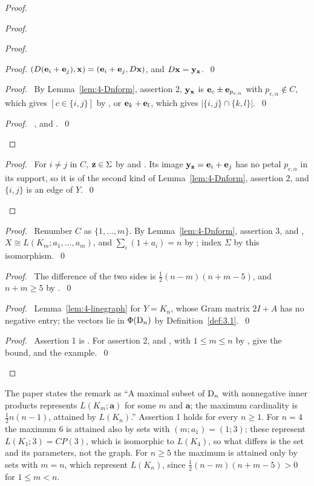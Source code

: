 \begin{proof}
\begin{proof}
\begin{proof}
\begin{proof}
    $(D({\mathbf e}_i+{\mathbf e}_j),{\mathbf x})=({\mathbf e}_i+{\mathbf e}_j,D{\mathbf x})$, and $D{\mathbf x}={\mathbf y}_{\mathbf x}$.~\qed\end{proof}
   \begin{proof}\pf\ By Lemma~\ref{lem:4-Dnform}, assertion 2, ${\mathbf y}_{\mathbf x}$ is
    ${\mathbf e}_c\pm{\mathbf e}_{p_{c,\alpha}}$ with $p_{c,\alpha}\notin C$, which gives $[c\in\{i,j\}]$ by
    , or ${\mathbf e}_k+{\mathbf e}_l$, which gives $|\{i,j\}\cap\{k,l\}|$.~\qed\end{proof}
   \qedstep
   \begin{proof}\pf\ ,  and
    .~\qed\end{proof}
  \end{proof}
  \qedstep
  \begin{proof}\pf\ For $i\ne j$ in $C$, ${\mathbf z}\in\Sigma$ by  and . Its
   image ${\mathbf y}_{\mathbf z}={\mathbf e}_i+{\mathbf e}_j$ has no petal $p_{c,\alpha}$ in its support, so it is of the second
   kind of Lemma~\ref{lem:4-Dnform}, assertion 2, and $\{i,j\}$ is an edge of
   $Y$.~\qed\end{proof}
 \end{proof}
 \begin{proof}\pf\ Renumber $C$ as $\{1,\dots,m\}$. By Lemma~\ref{lem:4-Dnform}, assertion 3,
  and , $X\cong L(K_m;a_1,\dots,a_m)$, and $\sum_i(1+a_i)=n$ by
  ; index $\Sigma$ by this isomorphism.~\qed\end{proof}
 \begin{proof}\pf\ The difference of the two sides is $\frac12(n-m)(n+m-5)$, and $n+m\ge5$ by
  .~\qed\end{proof}
 \begin{proof}\pf\ Lemma~\ref{lem:4-linegraph} for $Y=K_n$, whose Gram matrix $2I+A$ has no
  negative entry; the vectors lie in $\Phi(\mathrm{D}_n)$ by
  Definition~\ref{def:3.1}.~\qed\end{proof}
 \qedstep
 \begin{proof}\pf\ Assertion 1 is . For assertion 2,  and
  , with $1\le m\le n$ by , give the bound, and
   the example.~\qed\end{proof}
\end{proof}
The paper states the remark as ``A maximal subset of $\mathrm{D}_n$ with nonnegative inner products
represents $L(K_m;\mathbf a)$ for some $m$ and $\mathbf a$; the maximum cardinality is
$\frac12n(n-1)$, attained by $L(K_n)$.'' Assertion 1 holds for every $n\ge1$. For $n=4$ the
maximum 6 is attained also by sets with $(m;a_1)=(1;3)$; these represent $L(K_1;3)=CP(3)$,
which is isomorphic to $L(K_4)$, so what differs is the set and its parameters, not the graph.
For $n\ge5$ the maximum is attained only by sets with $m=n$, which represent $L(K_n)$, since
$\frac12(n-m)(n+m-5)>0$ for $1\le m<n$.


